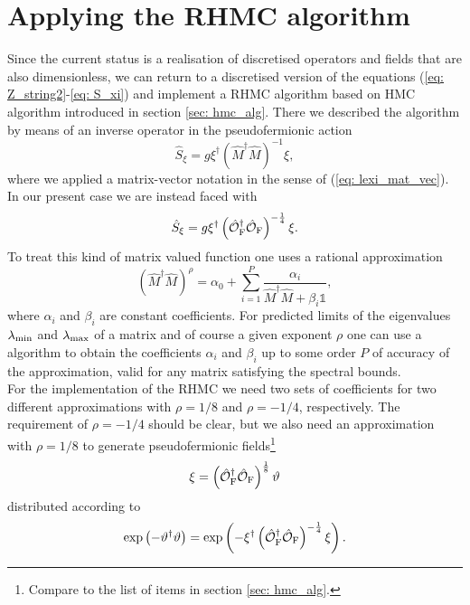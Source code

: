 \section{Applying the RHMC algorithm}
Since the current status is a realisation of discretised operators and fields that are also dimensionless, we can return to a discretised version of the equations (\ref{eq: Z_string2}-\ref{eq: S_xi}) and implement a RHMC algorithm based on HMC algorithm introduced in section \ref{sec: hmc_alg}. There we described the algorithm by means of an inverse  operator in the pseudofermionic action
%
%
\begin{equation}
\hat{S}_{\xi} = g \xi^{\dagger}\left(\hat{M}^{\dagger}\hat{M}\right)^{-1}\xi,
\end{equation}
%
%
where we applied a matrix-vector notation in the sense of (\ref{eq: lexi_mat_vec}). In our present case we are instead faced with
%
%
\begin{equation}
\hat{S}_{\xi} = g \xi^{\dagger}\left(\hat{\mathcal{O}}_{\rm F}^{\dagger}\hat{\mathcal{O}}_{\rm F}\right)^{-\frac{1}{4}} \xi.
\end{equation}
%
%
To treat this kind of matrix valued function one uses a rational approximation
%
%
\begin{equation}
\left(\hat{M}^{\dagger}\hat{M}\right)^{\rho	} = \alpha_{0} + \sum\limits_{i=1}^{P} \frac{\alpha_{i}}{\hat{M}^{\dagger}\hat{M}+\beta_{i}\mathds{1}},
\label{eq: rat_approx}
\end{equation}
%
%
where $\alpha_{i}$ and $\beta_{i}$ are constant coefficients. For predicted limits of the eigenvalues $\lambda_{\rm min}$ and $\lambda_{\rm max}$ of a matrix and of course a given exponent $\rho$ one can use a  algorithm to obtain the coefficients $\alpha_{i}$ and $\beta_{i}$ up to some order $P$ of accuracy of the approximation, valid for any matrix satisfying the spectral bounds.\\
For the implementation of the RHMC we need two sets of coefficients for two different approximations with $\rho=1/8$ and $\rho=-1/4$, respectively. The requirement of $\rho=-1/4$ should be clear, but we also need an approximation with $\rho=1/8$ to generate pseudofermionic fields\footnote{Compare to the list of items in section \ref{sec: hmc_alg}.} 
%
%
\begin{equation}
\xi = \left(\hat{\mathcal{O}}_{\rm F}^{\dagger}\hat{\mathcal{O}}_{\rm F}\right)^{\frac{1}{8}} \vartheta
\end{equation}
%
%
distributed according to
%
%
\begin{equation}
\exp\left(-\vartheta^{\dagger}\vartheta\right) = \exp\left( -\xi^{\dagger}\left(\hat{\mathcal{O}}_{\rm F}^{\dagger}\hat{\mathcal{O}}_{\rm F}\right)^{-\frac{1}{4}} \xi \right).
\end{equation}
